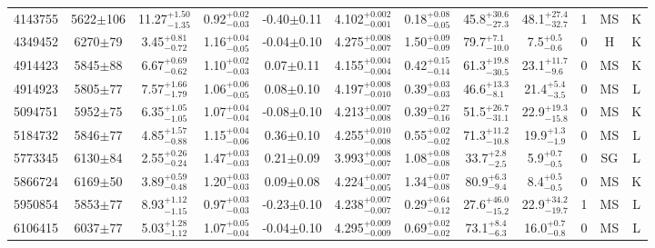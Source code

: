 \begin{longtable}{c|ccccc|ccc|ccc}
4143755 & 5622$\pm$106   & 11.27$_{-1.35}^{+1.50}$   & 0.92$_{-0.03}^{+0.02}$ & -0.40$\pm$0.11    & 4.102$_{-0.001}^{+0.002}$ & 0.18$_{-0.05}^{+0.08}$ & 45.8$_{-27.3}^{+30.6}$    & 48.1$_{-32.7}^{+27.4}$   & 1 &        MS & K \\
4349452 & 6270$\pm$79    & 3.45$_{-0.72}^{+0.81}$    & 1.16$_{-0.05}^{+0.04}$ & -0.04$\pm$0.10    & 4.275$_{-0.007}^{+0.008}$ & 1.50$_{-0.09}^{+0.09}$ & 79.7$_{-10.0}^{+7.1}$      & 7.5$_{-0.6}^{+0.5}$     & 0 &        H & K \\
4914423 & 5845$\pm$88    & 6.67$_{-0.62}^{+0.69}$    & 1.10$_{-0.03}^{+0.02}$ & 0.07$\pm$0.11     & 4.155$_{-0.004}^{+0.004}$ & 0.42$_{-0.14}^{+0.15}$ & 61.3$_{-30.5}^{+19.8}$    & 23.1$_{-9.6}^{+11.7}$    & 0 &        MS & K \\
4914923 & 5805$\pm$77    & 7.57$_{-1.79}^{+1.66}$    & 1.06$_{-0.05}^{+0.06}$ & 0.08$\pm$0.10     & 4.197$_{-0.010}^{+0.008}$ & 0.39$_{-0.03}^{+0.03}$ & 46.6$_{-8.1}^{+13.3}$     & 21.4$_{-3.5}^{+5.4}$     & 0 &        MS & L \\
5094751 & 5952$\pm$75    & 6.35$_{-1.05}^{+1.05}$    & 1.07$_{-0.04}^{+0.04}$ & -0.08$\pm$0.10    & 4.213$_{-0.008}^{+0.007}$ & 0.39$_{-0.16}^{+0.27}$ & 51.5$_{-31.1}^{+26.7}$    & 22.9$_{-15.8}^{+19.3}$   & 0 &        MS & K \\
5184732 & 5846$\pm$77    & 4.85$_{-0.88}^{+1.57}$    & 1.15$_{-0.06}^{+0.04}$ & 0.36$\pm$0.10     & 4.255$_{-0.008}^{+0.010}$ & 0.55$_{-0.02}^{+0.02}$ & 71.3$_{-10.8}^{+11.2}$    & 19.9$_{-1.9}^{+1.3}$     & 0 &        MS & L \\
5773345 & 6130$\pm$84    & 2.55$_{-0.24}^{+0.26}$    & 1.47$_{-0.03}^{+0.03}$ & 0.21$\pm$0.09     & 3.993$_{-0.007}^{+0.008}$ & 1.08$_{-0.08}^{+0.08}$ & 33.7$_{-2.5}^{+2.8}$      & 5.9$_{-0.5}^{+0.7}$      & 0 &        SG & L \\
5866724 & 6169$\pm$50    & 3.89$_{-0.48}^{+0.59}$    & 1.20$_{-0.03}^{+0.03}$ & 0.09$\pm$0.08     & 4.224$_{-0.005}^{+0.007}$ & 1.34$_{-0.08}^{+0.07}$ & 80.9$_{-9.4}^{+6.3}$      & 8.4$_{-0.5}^{+0.5}$      & 0 &        MS & K \\
5950854 & 5853$\pm$77    & 8.93$_{-1.15}^{+1.12}$    & 0.97$_{-0.03}^{+0.03}$ & -0.23$\pm$0.10    & 4.238$_{-0.007}^{+0.007}$ & 0.29$_{-0.12}^{+0.64}$ & 27.6$_{-15.2}^{+46.0}$    & 22.9$_{-19.7}^{+34.2}$   & 1 &        MS & L \\
6106415 & 6037$\pm$77    & 5.03$_{-1.12}^{+1.28}$    & 1.07$_{-0.04}^{+0.05}$ & -0.04$\pm$0.10    & 4.295$_{-0.009}^{+0.009}$ & 0.69$_{-0.02}^{+0.02}$ & 73.1$_{-6.3}^{+8.4}$      & 16.0$_{-0.8}^{+0.7}$     & 0 &        MS & L \\

\end{longtable}
